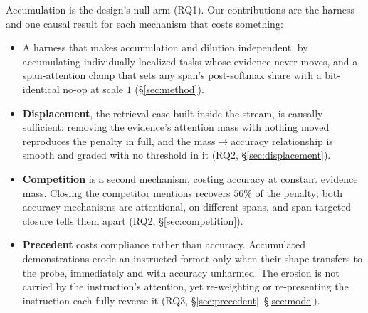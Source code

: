 \documentclass{article}
\begin{document}
Accumulation is the design's null arm (RQ1). Our contributions are the harness and one causal
result for each mechanism that costs something:

\begin{itemize}
  \item A harness that makes accumulation and dilution independent, by accumulating individually
        localized tasks whose evidence never moves, and a span-attention clamp that sets
        any span's post-softmax share with a bit-identical no-op at scale $1$
        (\S\ref{sec:method}).
  \item \textbf{Displacement}, the retrieval case built inside the stream, is causally
        sufficient: removing the evidence's attention mass with
        nothing moved reproduces the penalty in full, and the mass$\to$accuracy
        relationship is smooth and graded with no threshold in it (RQ2, \S\ref{sec:displacement}).
  \item \textbf{Competition} is a second mechanism, costing accuracy at
        constant evidence mass. Closing the competitor mentions recovers $56\%$ of
        the penalty; both accuracy mechanisms are attentional, on different spans, and
        span-targeted closure tells them apart (RQ2, \S\ref{sec:competition}).
  \item \textbf{Precedent} costs compliance rather than accuracy. Accumulated demonstrations
        erode an instructed format only when their shape transfers to the probe, immediately and
        with accuracy unharmed. The erosion is not carried by the instruction's attention, yet
        re-weighting or re-presenting the instruction each fully reverse it
        (RQ3, \S\ref{sec:precedent}--\S\ref{sec:mode}).
\end{itemize}
\end{document}
